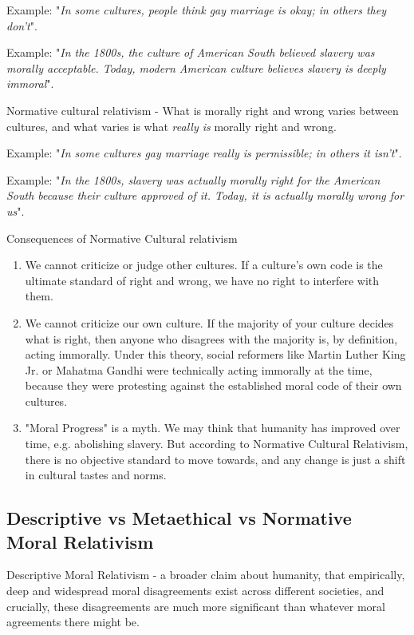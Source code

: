 \documentclass[12pt]{article}
\begin{document}
\noindent Example: "\textit{In some cultures, people think gay marriage is okay; in others they don't}".

\noindent Example: "\textit{In the 1800s, the culture of American South believed slavery was morally acceptable. Today, modern American culture believes slavery is deeply immoral}".

Normative cultural relativism - What is morally right and wrong varies between cultures, 
and what varies is what \textit{really is} morally right and wrong.

\noindent Example: "\textit{In some cultures gay marriage really is permissible; in others it isn't}".

\noindent Example: "\textit{In the 1800s, slavery was actually morally right for the American South because their culture approved of it. Today, it is actually morally wrong for us}".

\noindent Consequences of Normative Cultural relativism
\begin{enumerate}
    \item We cannot criticize or judge other cultures.
    If a culture's own code is the ultimate standard of right and wrong, we have no right to interfere with them.
    \item We cannot criticize our own culture.
    If the majority of your culture decides what is right, then anyone who disagrees with the majority is, by definition, acting immorally.
    Under this theory, social reformers like Martin Luther King Jr. or Mahatma Gandhi were technically acting immorally at the time, because they were protesting against the established moral code of their own cultures.
    \item "Moral Progress" is a myth. We may think that humanity has improved over time, e.g. abolishing slavery.
    But according to Normative Cultural Relativism, there is no objective standard to move towards, and any change is just a shift in cultural tastes and norms.
\end{enumerate}

\subsection{Descriptive vs Metaethical vs Normative Moral Relativism}
Descriptive Moral Relativism - a broader claim about humanity, that empirically, deep and widespread moral disagreements exist across different societies, 
and crucially, these disagreements are much more significant than whatever moral agreements there might be.
\end{document}
